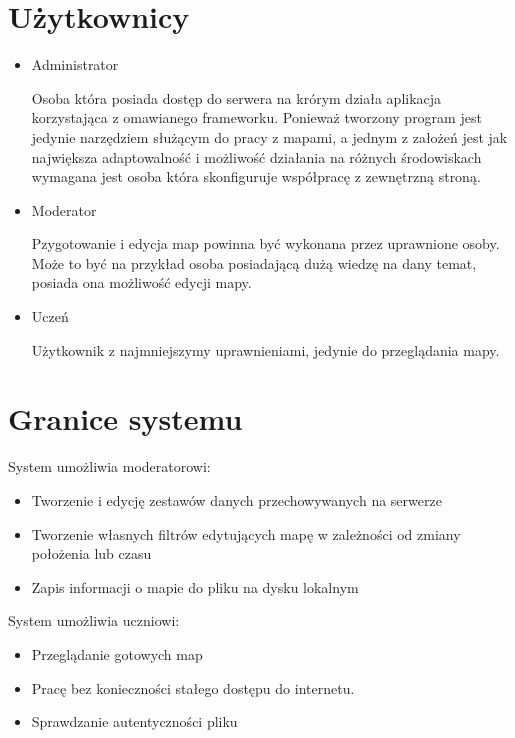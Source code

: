 \section{Użytkownicy}
\label{sec:uzytkownicy}

\begin{itemize}
\item
Administrator

Osoba która posiada dostęp do serwera na krórym działa aplikacja korzystająca z omawianego frameworku. Ponieważ tworzony program jest jedynie narzędziem służącym do pracy z mapami, a jednym z założeń jest jak największa adaptowalność i możliwość działania na różnych środowiskach wymagana jest osoba która skonfiguruje współpracę z zewnętrzną stroną.

\item
Moderator

Pzygotowanie i edycja map powinna być wykonana przez uprawnione osoby. Może to być na przykład osoba posiadającą dużą wiedzę na dany temat, posiada ona możliwość edycji mapy.
\item
Uczeń

Użytkownik z najmniejszymy uprawnieniami, jedynie do przeglądania mapy.
\end{itemize}

\section{Granice systemu}
\label{sec:granicesystemu}

System umożliwia moderatorowi:
\begin{itemize}
\item
Tworzenie i edycję zestawów danych przechowywanych na serwerze

\item
Tworzenie własnych filtrów edytujących mapę w zależności od zmiany położenia lub czasu

\item
Zapis informacji o mapie do pliku na dysku lokalnym

\end{itemize}

System umożliwia uczniowi:
\begin{itemize}
\item
Przeglądanie gotowych map

\item
Pracę bez konieczności stałego dostępu do internetu.

\item
Sprawdzanie autentyczności pliku 

\end{itemize}

